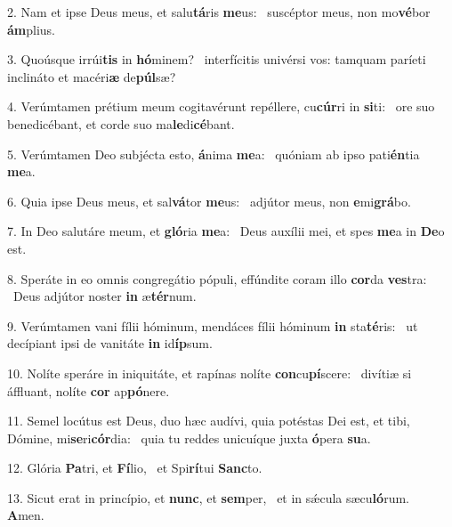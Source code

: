 2. Nam et ipse Deus meus, et salu\textbf{tá}ris \textbf{me}us: \ast\  suscéptor meus, non mo\textbf{vé}bor \textbf{ám}plius.\

3. Quoúsque irrúi\textbf{tis} in \textbf{hó}minem? \ast\  interfícitis univérsi vos: tamquam paríeti inclináto et macéri\textbf{æ} de\textbf{púl}sæ?\

4. Verúmtamen prétium meum cogitavérunt repéllere, cu\textbf{cúr}ri in \textbf{si}ti: \ast\  ore suo benedicébant, et corde suo ma\textbf{le}di\textbf{cé}bant.\

5. Verúmtamen Deo subjécta esto, \textbf{á}nima \textbf{me}a: \ast\  quóniam ab ipso pati\textbf{én}tia \textbf{me}a.\

6. Quia ipse Deus meus, et sal\textbf{vá}tor \textbf{me}us: \ast\  adjútor meus, non \textbf{e}mi\textbf{grá}bo.\

7. In Deo salutáre meum, et \textbf{gló}ria \textbf{me}a: \ast\  Deus auxílii mei, et spes \textbf{me}a in \textbf{De}o est.\

8. Speráte in eo omnis congregátio pópuli, effúndite coram illo \textbf{cor}da \textbf{ves}tra: \ast\  Deus adjútor noster \textbf{in} æ\textbf{tér}num.\

9. Verúmtamen vani fílii hóminum, mendáces fílii hóminum \textbf{in} sta\textbf{té}ris: \ast\  ut decípiant ipsi de vanitáte \textbf{in} id\textbf{íp}sum.\

10. Nolíte speráre in iniquitáte, et rapínas nolíte \textbf{con}cu\textbf{pí}scere: \ast\  divítiæ si áffluant, nolíte \textbf{cor} ap\textbf{pó}nere.\

11. Semel locútus est Deus, duo hæc audívi, quia potéstas Dei est, et tibi, Dómine, mi\textbf{se}ri\textbf{cór}dia: \ast\  quia tu reddes unicuíque juxta \textbf{ó}pera \textbf{su}a.\

12. Glória \textbf{Pa}tri, et \textbf{Fí}lio, \ast\  et Spi\textbf{rí}tui \textbf{Sanc}to.\

13. Sicut erat in princípio, et \textbf{nunc}, et \textbf{sem}per, \ast\  et in sǽcula sæcu\textbf{ló}rum. \textbf{A}men.\

